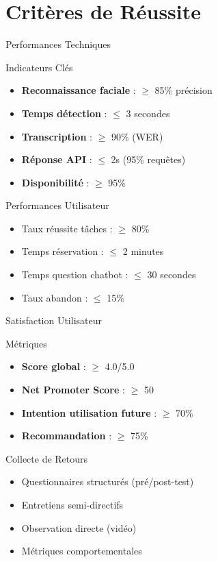 \documentclass[aspectratio=169,11pt]{beamer}
\begin{document}

\section{Critères de Réussite}

\begin{frame}{Performances Techniques}
\begin{block}{Indicateurs Clés}
\begin{itemize}
    \item \textbf{Reconnaissance faciale} : $\geq$ 85\% précision
    \item \textbf{Temps détection} : $\leq$ 3 secondes
    \item \textbf{Transcription} : $\geq$ 90\% (WER)
    \item \textbf{Réponse API} : $\leq$ 2s (95\% requêtes)
    \item \textbf{Disponibilité} : $\geq$ 95\%
\end{itemize}
\end{block}

\begin{block}{Performances Utilisateur}
\begin{itemize}
    \item Taux réussite tâches : $\geq$ 80\%
    \item Temps réservation : $\leq$ 2 minutes
    \item Temps question chatbot : $\leq$ 30 secondes
    \item Taux abandon : $\leq$ 15\%
\end{itemize}
\end{block}
\end{frame}

\begin{frame}{Satisfaction Utilisateur}
\begin{block}{Métriques}
\begin{itemize}
    \item \textbf{Score global} : $\geq$ 4.0/5.0
    \item \textbf{Net Promoter Score} : $\geq$ 50
    \item \textbf{Intention utilisation future} : $\geq$ 70\%
    \item \textbf{Recommandation} : $\geq$ 75\%
\end{itemize}
\end{block}

\begin{block}{Collecte de Retours}
\begin{itemize}
    \item Questionnaires structurés (pré/post-test)
    \item Entretiens semi-directifs
    \item Observation directe (vidéo)
    \item Métriques comportementales
\end{itemize}
\end{block}
\end{frame}
\end{document}
